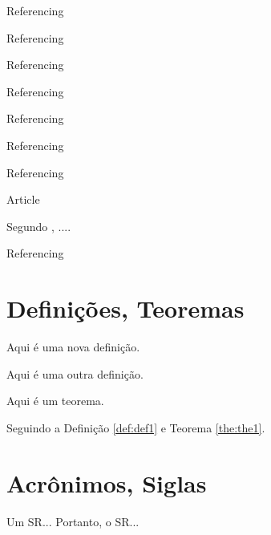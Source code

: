 \begin{alineas}
  \item Referencing 
  \item Referencing 
  \item Referencing 
  \item Referencing 
  \item Referencing 
  \item Referencing 
  \item Referencing 
  \item Article \cite{braida2015transforming}
  \item Segundo , ....
  \item Referencing   
\end{alineas}



\section{Definições, Teoremas}

\begin{definition}\label{def:def1}
  Aqui é uma nova definição.
\end{definition}

\begin{definition}[Título] \label{def:def2}
  Aqui é uma outra definição.
\end{definition}

\begin{theorem}\label{the:the1}
  Aqui é um teorema.
\end{theorem}

Seguindo a Definição \ref{def:def1} e Teorema \ref{the:the1}.



\section{Acrônimos, Siglas}
  Um \ac{SR}... Portanto, o \ac{SR}...